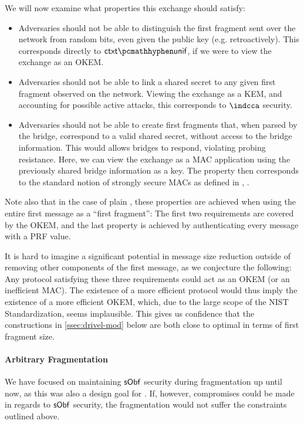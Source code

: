 We will now examine what properties this exchange should satisfy:
\begin{itemize}
    \item Adversaries should not be able to distinguish the first fragment sent over the network from random bits, even given the public key (e.g. retroactively). This corresponds directly to $\ctxtunif$, if we were to view the exchange as an OKEM.

    \item Adversaries should not be able to link a shared secret to any given first fragment observed on the network. Viewing the exchange as a KEM, and accounting for possible active attacks, this corresponds to $\indcca$ security.
    
    \item Adversaries should not be able to create first fragments that, when parsed by the bridge, correspond to a valid shared secret, without access to the bridge information. This would allows bridges to respond, violating probing resistance. Here, we can view the exchange as a MAC application using the previously shared bridge information as a key. The property then corresponds to the standard notion of strongly secure MACs as defined in \cite[Definition~4.3]{katz_lindell}, \cite[Chapter~2]{AC:BelNam00}.
\end{itemize}

Note also that in the case of plain \drivel{}, these properties are achieved when using the entire first message as a ``first fragment'': The first two requirements are covered by the OKEM, and the last property is achieved by authenticating every message with a PRF value.

It is hard to imagine a significant potential in message size reduction outside of removing other components of the first \drivel{} message, as we conjecture the following: Any protocol satisfying these three requirements could act as an OKEM (or an inefficient MAC). The existence of a more efficient protocol would thus imply the existence of a more efficient OKEM, which, due to the large scope of the NIST Standardization, seems implausible. This gives us confidence that the constructions in \cref{ssec:drivel-mod} below are both close to optimal in terms of first fragment size.

\paragraph{Arbitrary Fragmentation}
We have focused on maintaining $\mathsf{sObf}$ security during fragmentation up until now, as this was also a design goal for \drivel{}.
If, however, compromises could be made in regards to $\mathsf{sObf}$ security, the fragmentation would not suffer the constraints outlined above.

